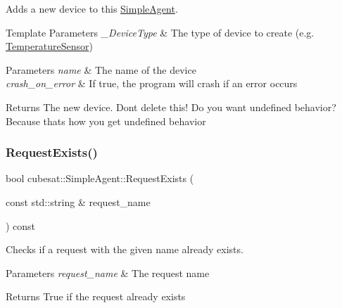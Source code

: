 Adds a new device to this \hyperlink{classcubesat_1_1SimpleAgent}{Simple\+Agent}. 


\begin{DoxyTemplParams}{Template Parameters}
{\em \+\_\+\+Device\+Type} & The type of device to create (e.\+g. \hyperlink{classcubesat_1_1TemperatureSensor}{Temperature\+Sensor}) \\
\hline
\end{DoxyTemplParams}

\begin{DoxyParams}{Parameters}
{\em name} & The name of the device \\
\hline
{\em crash\+\_\+on\+\_\+error} & If true, the program will crash if an error occurs \\
\hline
\end{DoxyParams}
\begin{DoxyReturn}{Returns}
The new device. Don\textquotesingle{}t delete this! Do you want undefined behavior? Because that\textquotesingle{}s how you get undefined behavior 
\end{DoxyReturn}
\mbox{\label{classcubesat_1_1SimpleAgent_a7e192cc7fea9421f191ef764ebe0433c}} 
\subsubsection{\texorpdfstring{Request\+Exists()}{RequestExists()}}
{\footnotesize\ttfamily bool cubesat\+::\+Simple\+Agent\+::\+Request\+Exists (\begin{DoxyParamCaption}\item[{const std\+::string \&}]{request\+\_\+name }\end{DoxyParamCaption}) const\hspace{0.3cm}{\ttfamily [inline]}}



Checks if a request with the given name already exists. 


\begin{DoxyParams}{Parameters}
{\em request\+\_\+name} & The request name \\
\hline
\end{DoxyParams}
\begin{DoxyReturn}{Returns}
True if the request already exists 
\end{DoxyReturn}
\mbox{\label{classcubesat_1_1SimpleAgent_acdb5ed645b45e352a921c630e2f6c67e}} 
